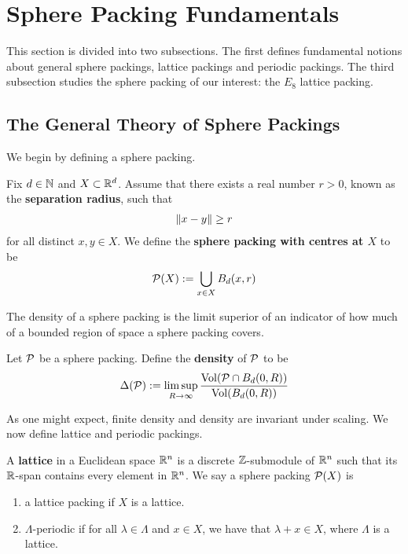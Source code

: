 \section{Sphere Packing Fundamentals}

This section is divided into two subsections. The first defines fundamental notions about general sphere packings, lattice packings and periodic packings. The third subsection studies the sphere packing of our interest: the $E_8$ lattice packing.

\subsection{The General Theory of Sphere Packings}

We begin by defining a sphere packing.

\begin{boxdefinition}
    Fix $d \in \mathbb{N}$ and $X \subset \mathbb{R}^d$. Assume that there exists a real number $r > 0$, known as the \textbf{separation radius}, such that
    \begin{align*}
        \left\lVert x - y \right\rVert \geq r
    \end{align*}
    for all distinct $x, y \in X$. We define the \textbf{sphere packing with centres at $X$} to be
    \begin{align*}
        \mathcal{P}(X) := \bigcup_{x \in X} B_d(x, r)
    \end{align*}
\end{boxdefinition}

The density of a sphere packing is the limit superior of an indicator of how much of a bounded region of space a sphere packing covers.

\begin{boxdefinition}[Density]\label{Ch2:Def:Density}
    Let $\mathcal{P}$ be a sphere packing. Define the \textbf{density} of $\mathcal{P}$ to be
    \begin{align*}
        \Delta(\mathcal{P}) := \limsup_{R \to \infty}\frac{\operatorname{Vol}\!\left( \mathcal{P} \cap B_d(0, R) \right)}{\operatorname{Vol}\!\left( B_d(0, R) \right)}
    \end{align*}
\end{boxdefinition}

As one might expect, finite density and density are invariant under scaling. We now define lattice and periodic packings.

\begin{boxdefinition}
    A \textbf{lattice} in a Euclidean space $\mathbb{R}^n$ is a discrete $\mathbb{Z}$-submodule of $\mathbb{R}^n$ such that its $\mathbb{R}$-span contains every element in $\mathbb{R}^n$. We say a sphere packing $\mathcal{P}(X)$ is
    \begin{enumerate}
        \item a lattice packing if $X$ is a lattice.
        \item $\Lambda$-periodic if for all $\lambda \in \Lambda$ and $x \in X$, we have that $\lambda + x \in X$, where $\Lambda$ is a lattice.
    \end{enumerate}
\end{boxdefinition}

